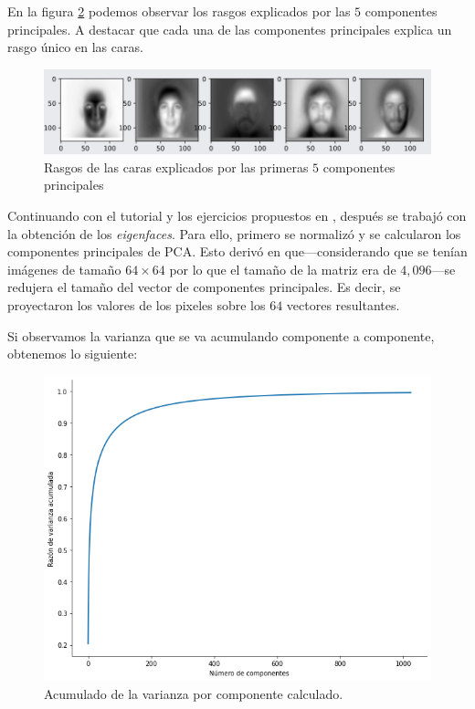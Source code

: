 \documentclass[conference]{IEEEtran}
\begin{document}
En la figura \ref{fig:svd_pc} podemos observar los rasgos explicados por las $5$ componentes principales. A destacar que cada una de las componentes principales explica un rasgo único en las caras. 

\begin{figure}[H]
    \centering
    \includegraphics[scale=0.25]{imgs/first_5_pc.png}
    \caption{Rasgos de las caras explicados por las primeras $5$ componentes principales}
    \label{fig:svd_pc}
\end{figure}

Continuando con el tutorial y los ejercicios propuestos en \cite{sandipan}, después se trabajó con la obtención de los \textit{eigenfaces}. Para ello, primero se normalizó y se calcularon los componentes principales de PCA. Esto derivó en que---considerando que se tenían imágenes de tamaño $64 \times 64$ por lo que el tamaño de la matriz era de $4,096$---se redujera el tamaño del vector de componentes principales. Es decir, se proyectaron los valores de los pixeles sobre los $64$ vectores resultantes.

Si observamos la varianza que se va acumulando componente a componente, obtenemos lo siguiente:

\begin{figure}[H]
    \centering
    \includegraphics[scale=0.25]{imgs/cum_componentes.png}
    \caption{Acumulado de la varianza por componente calculado.}
    \label{fig:svd_pc}
\end{figure}
\end{document}
